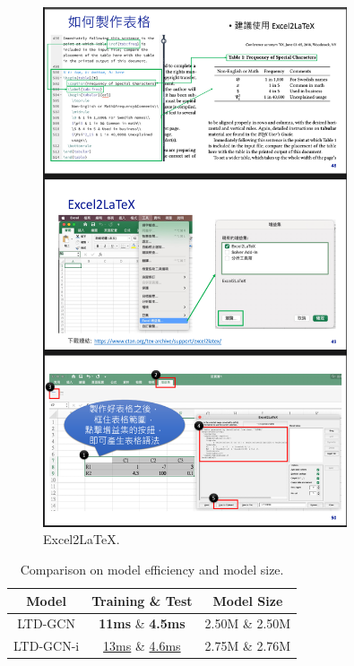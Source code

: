 \begin{figure}[htb]
	\centering
	\includegraphics[width=0.8\textwidth]{img/excel2latex.png}
	\caption{Excel2LaTeX.}
	\label{fig:excel2latex}
\end{figure}


\begin{table} [h]
\centering
\caption{Comparison on model efficiency and model size.}
\begin{tabular}{c|c|c}
\toprule[1.25pt]
Model   & {Training \& Test }  & {Model Size }      \\ 
\midrule
LTD-GCN   & \textbf{11ms}    \& \textbf{4.5ms}       & 2.50M             \& 2.50M     \\ 
LTD-GCN-i & \underline{13ms} \& \underline{4.6ms}    & 2.75M             \& 2.76M     \\  
\bottomrule[1.25pt]
\end{tabular}
\label{table:model_com}
\end{table}